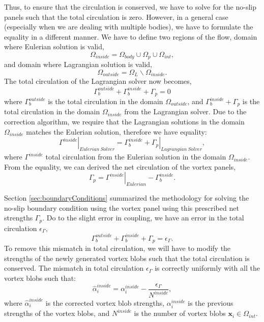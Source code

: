 Thus, to ensure that the circulation is conserved, we have to solve for the no-slip panels such that the total circulation is zero. However, in a general case (especially when we are dealing with multiple bodies), we have to formulate the equality in a different manner. We have to define two regions of the flow, domain where Eulerian solution is valid, 
\begin{equation}
\Omega_{inside} = \Omega_{body} \cup \Omega_p \cup \Omega_{int},
\end{equation}
and domain where Lagrangian solution is valid,
\begin{equation}
\Omega_{outside} = \Omega_L \backslash \Omega_{inside}.
\end{equation}
The total circulation of the Lagrangian solver now becomes,
\begin{equation}
\Gamma_{b}^{outside} + \Gamma_{b}^{inside} + \Gamma_p = 0
\end{equation}
where $\Gamma_{b}^{outside}$ is the total circulation in the domain $\Omega_{outside}$, and $\Gamma_{b}^{inside} + \Gamma_p$ is the total circulation in the domain $\Omega_{inside}$ from the Lagrangian solver. Due to the correction algorithm, we require that the Lagrangian solutions in the domain $\Omega_{inside}$ matches the Eulerian solution, therefore we have equality:
\begin{equation}
\left. \Gamma^{inside} \right|_{Eulerian\ Solver} = \left. \Gamma_{b}^{inside} + \Gamma_p \right|_{Lagrangian\ Solver},
\end{equation}
where $\Gamma^{inside}$ total circulation from the Eulerian solution in the domain $\Omega_{inside}$. From the equality, we can derived the net circulation of the vortex panels,
\begin{equation}
\Gamma_p = \left. \Gamma^{inside} \right|_{Eulerian} - \Gamma_{b}^{inside}.
\end{equation}

Section \ref{sec:boundaryConditions} summarized the methodology for solving the no-slip boundary condition using the vortex panel using this prescribed net strengths $\Gamma_p$. Do to the slight error in coupling, we have an error in the total circulation $\epsilon_{\Gamma}$,
\begin{equation}
\Gamma_{b}^{outside} + \Gamma_{b}^{inside} + \Gamma_{p} = \epsilon_{\Gamma}.
\end{equation}
To remove this mismatch in total circulation, we will have to modify the strengths of the newly generated vortex blobs such that the total circulation is conserved. The mismatch in total circulation $\epsilon_{\Gamma}$ is correctly uniformly with all the vortex blobs such that:
\begin{equation}
\hat{\alpha}_i^{inside} = \alpha_i^{inside} - \frac{\epsilon_{\Gamma}}{N^{inside}},
\end{equation}
where $\hat{\alpha}_i^{inside}$ is the corrected vortex blob strengths, $\alpha_i^{inside}$ is the previous strengths of the vortex blobs, and $N^{inside}$ is the number of vortex blobs $\mathbf{x}_i \in \Omega_{int}$.

